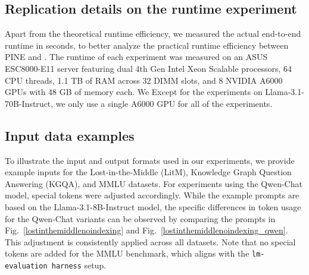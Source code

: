 \subsection{Replication details on the runtime experiment}
\label{appendix:runime_details}
Apart from the theoretical runtime efficiency, we measured the actual end-to-end runtime in seconds, to better analyze the practical runtime efficiency between PINE and \ours{}.
The runtime of each experiment was measured on an ASUS ESC8000-E11 server featuring dual 4th Gen Intel Xeon Scalable processors, 64 CPU threads, 1.1 TB of RAM across 32 DIMM slots, and 8 NVIDIA A6000 GPUs with 48 GB of memory each. We  Except for the experiments on Llama-3.1-70B-Instruct, we only use a single A6000 GPU for all of the experiments. 


\subsection{Input data examples}
\label{appendix:inputexamples}
To illustrate the input and output formats used in our experiments, we provide example inputs for the Lost-in-the-Middle (LitM), Knowledge Graph Question Answering (KGQA), and MMLU datasets. For experiments using the Qwen-Chat model, special tokens were adjusted accordingly. While the example prompts are based on the Llama-3.1-8B-Instruct model, the specific differences in token usage for the Qwen-Chat variants can be observed by comparing the prompts in Fig.~\ref{lostinthemiddlenoindexing} and Fig.~\ref{lostinthemiddlenoindexing_qwen}. This adjustment is consistently applied across all datasets. Note that no special tokens are added for the MMLU benchmark, which aligns with the \texttt{lm-evaluation harness} setup.

